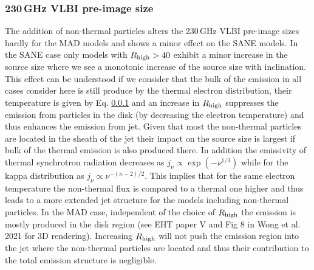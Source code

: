 \subsubsection{230\,GHz VLBI pre-image size}
The addition of non-thermal particles alters the 230\,GHz VLBI pre-image sizes hardly for the MAD models and shows a minor effect on the SANE models. In the SANE case only models with $R_{\rm high}>40$ exhibit a minor increase in the source size where we see a monotonic increase of the source size with inclination. This effect can be understood if we consider that the bulk of the emission in all cases consider here is still produce by the thermal electron distribution, their temperature is given by Eq. \ref{} and an increase in $R_{\rm high}$ suppresses the emission from particles in the disk (by decreasing the electron temperature) and thus enhances the emission from jet.
Given that most the non-thermal particles are located in the sheath of the jet their impact on the source size is largest if bulk of the thermal emission is also produced there. In addition the emissivity of thermal synchrotron radiation decreases as $j_{\nu}\propto \exp{\left(-\nu^{1/3}
\right)}$ while for the kappa distribution as $j_{\nu}\propto \nu^{-(\kappa -2)/2}$. This implies that for the same electron temperature the non-thermal flux is compared to a thermal one higher and thus leads to a more extended jet structure for the models including non-thermal particles.
\newline In the MAD case, independent of the choice of $R_{\rm high}$ the emission is mostly produced in the disk region (see EHT paper V and Fig 8 in Wong et al. 2021 for 3D rendering). Increasing $R_{\rm high}$ will not push the emission region into the jet where the non-thermal particles are located and thus their contribution to the total emission structure is negligible.


